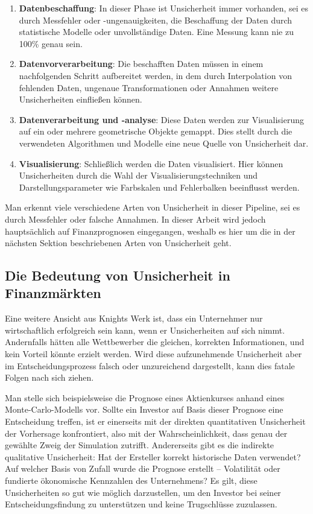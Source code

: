 \begin{enumerate}
    \item \textbf{Datenbeschaffung}: In dieser Phase ist Unsicherheit immer vorhanden, sei es durch Messfehler oder -ungenauigkeiten, die Beschaffung der Daten durch statistische Modelle oder unvollständige Daten. Eine Messung kann nie zu 100\% genau sein.
    
    \item \textbf{Datenvorverarbeitung}: Die beschafften Daten müssen in einem nachfolgenden Schritt aufbereitet werden, in dem durch Interpolation von fehlenden Daten, ungenaue Transformationen oder Annahmen weitere Unsicherheiten einfließen können.
    
    \item \textbf{Datenverarbeitung und -analyse}: Diese Daten werden zur Visualisierung auf ein oder mehrere geometrische Objekte gemappt. Dies stellt durch die verwendeten Algorithmen und Modelle eine neue Quelle von Unsicherheit dar.
    
    \item \textbf{Visualisierung}: Schließlich werden die Daten visualisiert. Hier können Unsicherheiten durch die Wahl der Visualisierungstechniken und Darstellungsparameter wie Farbskalen und Fehlerbalken beeinflusst werden.
\end{enumerate}

Man erkennt viele verschiedene Arten von Unsicherheit in dieser Pipeline, sei es durch Messfehler oder falsche Annahmen. In dieser Arbeit wird jedoch hauptsächlich auf Finanzprognosen eingegangen, weshalb es hier um die in der nächsten Sektion beschriebenen Arten von Unsicherheit geht.

\subsection{Die Bedeutung von Unsicherheit in Finanzmärkten}

Eine weitere Ansicht aus Knights Werk ist, dass ein Unternehmer nur wirtschaftlich erfolgreich sein kann, wenn er Unsicherheiten auf sich nimmt. Andernfalls hätten alle Wettbewerber die gleichen, korrekten Informationen, und kein Vorteil könnte erzielt werden. Wird diese aufzunehmende Unsicherheit aber im Entscheidungsprozess falsch oder unzureichend dargestellt, kann dies fatale Folgen nach sich ziehen.

Man stelle sich beispielsweise die Prognose eines Aktienkurses anhand eines Monte-Carlo-Modells vor. Sollte ein Investor auf Basis dieser Prognose eine Entscheidung treffen, ist er einerseits mit der direkten quantitativen Unsicherheit der Vorhersage konfrontiert, also mit der Wahrscheinlichkeit, dass genau der gewählte Zweig der Simulation zutrifft. Andererseits gibt es die indirekte qualitative Unsicherheit: Hat der Ersteller korrekt historische Daten verwendet? \cite{Padilla2021} Auf welcher Basis von Zufall wurde die Prognose erstellt – Volatilität oder fundierte ökonomische Kennzahlen des Unternehmens? Es gilt, diese Unsicherheiten so gut wie möglich darzustellen, um den Investor bei seiner Entscheidungsfindung zu unterstützen und keine Trugschlüsse zuzulassen.

